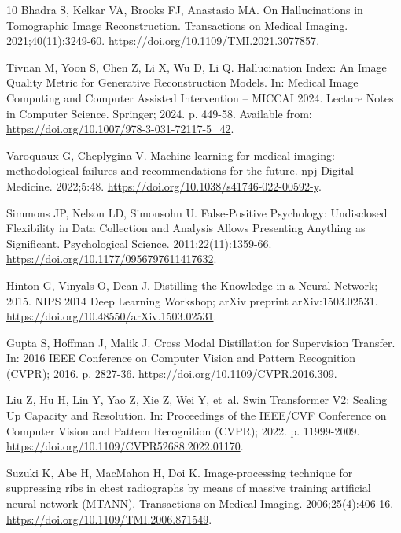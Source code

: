 \begin{thebibliography}{10}
Bhadra S, Kelkar VA, Brooks FJ, Anastasio MA.
\newblock On Hallucinations in Tomographic Image Reconstruction.
 Transactions on Medical Imaging. 2021;40(11):3249-60.
\newblock \url{https://doi.org/10.1109/TMI.2021.3077857}.

Tivnan M, Yoon S, Chen Z, Li X, Wu D, Li Q.
\newblock Hallucination Index: An Image Quality Metric for Generative
  Reconstruction Models.
\newblock In: Medical Image Computing and Computer Assisted Intervention --
  {MICCAI} 2024. Lecture Notes in Computer Science. Springer; 2024. p. 449-58.
\newblock Available from: \url{https://doi.org/10.1007/978-3-031-72117-5_42}.

Varoquaux G, Cheplygina V.
\newblock Machine learning for medical imaging: methodological failures and
  recommendations for the future.
\newblock npj Digital Medicine. 2022;5:48.
\newblock \url{https://doi.org/10.1038/s41746-022-00592-y}.

Simmons JP, Nelson LD, Simonsohn U.
\newblock False-Positive Psychology: Undisclosed Flexibility in Data Collection
  and Analysis Allows Presenting Anything as Significant.
\newblock Psychological Science. 2011;22(11):1359-66.
\newblock \url{https://doi.org/10.1177/0956797611417632}.

Hinton G, Vinyals O, Dean J. Distilling the Knowledge in a Neural Network;
  2015.
\newblock NIPS 2014 Deep Learning Workshop; arXiv preprint arXiv:1503.02531.
\newblock \url{https://doi.org/10.48550/arXiv.1503.02531}.

Gupta S, Hoffman J, Malik J.
\newblock Cross Modal Distillation for Supervision Transfer.
\newblock In: 2016 IEEE Conference on Computer Vision and Pattern Recognition
  (CVPR); 2016. p. 2827-36.
\newblock \url{https://doi.org/10.1109/CVPR.2016.309}.

Liu Z, Hu H, Lin Y, Yao Z, Xie Z, Wei Y, et~al.
\newblock Swin Transformer {V2}: Scaling Up Capacity and Resolution.
\newblock In: Proceedings of the {IEEE/CVF} Conference on Computer Vision and
  Pattern Recognition ({CVPR}); 2022. p. 11999-2009.
\newblock \url{https://doi.org/10.1109/CVPR52688.2022.01170}.

Suzuki K, Abe H, MacMahon H, Doi K.
\newblock Image-processing technique for suppressing ribs in chest radiographs
  by means of massive training artificial neural network ({MTANN}).
 Transactions on Medical Imaging. 2006;25(4):406-16.
\newblock \url{https://doi.org/10.1109/TMI.2006.871549}.


\end{thebibliography}
